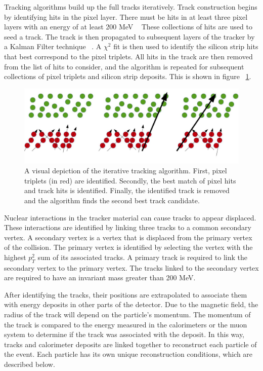\documentclass[oneside, letterpaper, oldfontcommands]{memoir}
\begin{document}
\qquad Tracking algorithms build up the full tracks iteratively. Track construction begins by identifying hits in the pixel layer. There must be hits in at least three pixel layers with an energy of at least 200 MeV ~\cite{Chatrchyan:2014fea} These collections of hits are used to seed a track. The track is then propagated to subsequent layers of the tracker by a Kalman Filter technique ~\cite{Fruhwirth:1987fm}. A $\chi^2$ fit is then used to identify the silicon strip hits that best correspond to the pixel triplets. All hits in the track are then removed from the list of hits to consider, and the algorithm is repeated for subsequent collections of pixel triplets and silicon strip deposits. This is shown in figure ~\ref{fig:iteratetrack}.

\begin{figure}[here]
\includegraphics[width=1.1\textwidth]{iterativetracking.jpg}
\caption{A visual depiction of the iterative tracking algorithm. First, pixel triplets (in red) are identified.  Secondly, the best match of pixel hits and track hits is identified. Finally, the identified track is removed and the algorithm finds the second best track candidate. }
\label{fig:iteratetrack}
\end{figure}


\qquad Nuclear interactions in the tracker material can cause tracks to appear displaced. These interactions are identified by linking three tracks to a common secondary vertex. A secondary vertex is a vertex that is displaced from the primary vertex of the collision. The primary vertex is identified by selecting the vertex with the highest $p_{T}^{2}$ sum of its associated tracks. A primary track is required to link the secondary vertex to the primary vertex. The tracks linked to the secondary vertex are required to have an invariant mass greater than 200 MeV. 


\qquad After identifying the tracks, their positions are extrapolated to associate them with energy deposits in other parts of the detector. Due to the magnetic field, the radius of the track will depend on the particle's momentum. The momentum of the track is compared to the energy measured in the calorimeters or the muon system to determine if the track was associated with the deposit. In this way, tracks and calorimeter deposits are linked together to reconstruct each particle of the event. Each particle has its own unique reconstruction conditions, which are described below.
\end{document}
